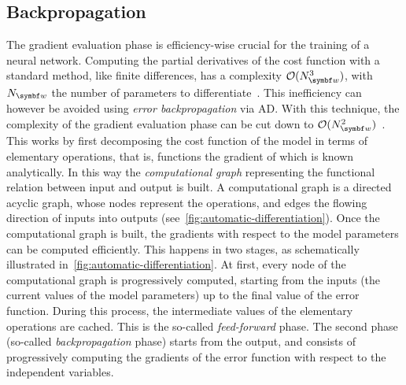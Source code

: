 \subsection{Backpropagation}
\label{subsec:backpropagation}
The gradient evaluation phase is efficiency-wise crucial for the training of a neural network.
Computing the partial derivatives of the cost function with a standard method, like finite differences, has a complexity $\mathcal O(N_{\bs w}^3)$, with $N_{\bs w}$ the number of parameters to differentiate~\cite{bishop2006pattern}.
This inefficiency can however be avoided using \emph{error backpropagation} via \ac{AD}.
With this technique, the complexity of the gradient evaluation phase can be cut down to $\mathcal O(N_{\bs w}^2)$~\cite{bishop2006pattern}.
This works by first decomposing the cost function of the model in terms of elementary operations, that is, functions the gradient of which is known analytically.
In this way the \emph{computational graph} representing the functional relation between input and output is built.
A computational graph is a directed acyclic graph, whose nodes represent the operations, and edges the flowing direction of inputs into outputs (see~\cref{fig:automatic-differentiation}).
Once the computational graph is built, the gradients with respect to the model parameters can be computed efficiently.
This happens in two stages, as schematically illustrated in~\cref{fig:automatic-differentiation}.
At first, every node of the computational graph is progressively computed, starting from the inputs (the current values of the model parameters) up to the final value of the error function.
During this process, the intermediate values of the elementary operations are cached.
This is the so-called \emph{feed-forward} phase.
The second phase (so-called \emph{backpropagation} phase) starts from the output, and consists of progressively computing the gradients of the error function with respect to the independent variables.

